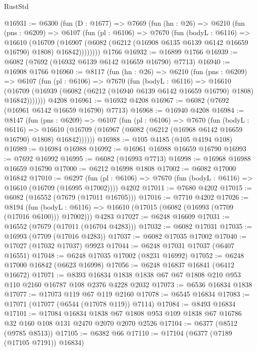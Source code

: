 \begin{lexlean}{RustStd}
\begin{coremodule}
@16931 := @6300
    (fun (D : @1677) =>
    @7669
      (fun (hn : @26) =>
      @6210
        (fun (pns : @6209) =>
        @6107
          (fun (pl : @6106) =>
          @7670
            (fun (bodyL : @6116) =>
            @16610
              (@16709
                (@16907 (@6082 (@6212 (@16908 @6135 @6139 @6142 @16659 @16790) @1808) @16842))))))))
    @1766
@16932 := @16899 @1766
@16939 := @6082 (@7692 (@16932 @6139 @6142 @16659 @16790) @7713)
@16940 := @16908 @1766
@16960 := @8117
    (fun (hn : @26) =>
    @6210
      (fun (pns : @6209) =>
      @6107
        (fun (pl : @6106) =>
        @7670
          (fun (bodyL : @6116) =>
          @16610
            (@16709 (@16939 (@6082 (@6212 (@16940 @6139 @6142 @16659 @16790) @1808) @16842)))))))
    @4208
@16961 := @16932 @4208
@16967 := @6082 (@7692 (@16961 @6142 @16659 @16790) @7713)
@16968 := @16940 @4208
@16984 := @8147
    (fun (pns : @6209) =>
    @6107
      (fun (pl : @6106) =>
      @7670
        (fun (bodyL : @6116) =>
        @16610 (@16709 (@16967 (@6082 (@6212 (@16968 @6142 @16659 @16790) @1808) @16842))))))
@16988 := @105 @4185 (@105 @4194 @108)
@16989 := @16984 @16988
@16992 := @16961 @16988 @16659 @16790
@16993 := @7692 @16992
@16995 := @6082 (@16993 @7713)
@16998 := @16968 @16988 @16659 @16790
@17000 := @6212 @16998 @1808
@17002 := @6082 @17000 @16842
@17010 := @6297
    (fun (pl : @6106) => @7670 (fun (bodyL : @6116) => @16610 (@16709 (@16995 @17002))))
    @4202
@17011 := @7680 @4202
@17015 := @6082 (@16552 (@7679 (@17011 @16705)))
@17016 := @7710 @4202
@17026 := @8194
    (fun (bodyL : @6116) => @16610 (@17015 (@6082 (@16993 (@7709 (@17016 @6100))) @17002)))
    @4283
@17027 := @6248 @16609
@17031 := @16552 (@7679 (@17011 (@16704 @4283)))
@17032 := @6082 @17031
@17035 := @16993 (@7709 (@17016 @4283))
@17037 := @6082 @17035 @17002
@17040 := @17027 (@17032 @17037) @9923
@17044 := @6248 @17031 @17037 (@6407 @16551)
@17048 := @6248 @17035 @17002 (@8231 @16992)
@17052 := @6248 @17000 @16842 (@6623 @16998)
@17056 := @6248 @16837 @16841 (@6412 @16672)
@17071 := @8393 @16834 @1838 @1838 @67 @67 @1808 @210 @953 @110 @2160 @16787 @108 @2376 @4228 @2032
@17073 := @6536 @16834 @1838
@17077 := @17073 @119 @67 @119 @2160
@17078 := @6545 @16834
@17083 := @17071 (@17077 (@6544 (@17078 @119)) @7114)
@17084 := @8493 @16834
@17101 := @17084
    @16834
    @1838
    @67
    @1808
    @953
    @109
    @1838
    @67
    @16786
    @32
    @160
    @108
    @131
    @2470
    @2070
    @2070
    @2526
@17104 := @6377 (@8512 (@9785 @8513))
@17105 := @6382 @66
@17110 := @17104 (@6377 (@7189 (@17105 @7191)) @16834)

\end{coremodule}
\end{lexlean}
